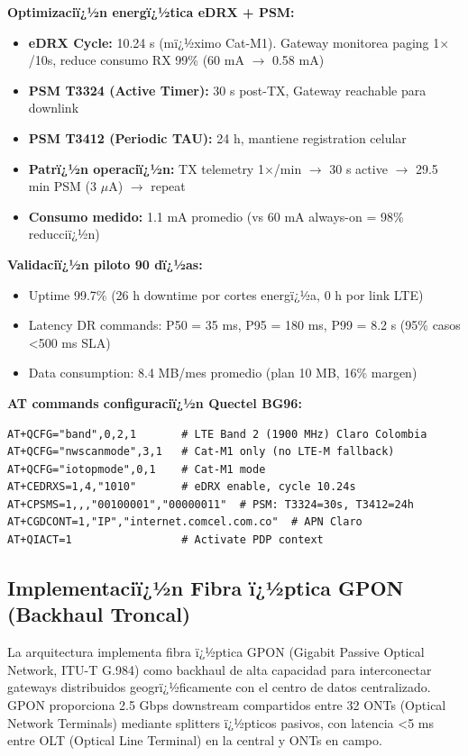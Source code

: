 \textbf{Optimizaciï¿½n energï¿½tica eDRX + PSM:}

\begin{itemize}
    \item \textbf{eDRX Cycle:} 10.24 s (mï¿½ximo Cat-M1). Gateway monitorea paging 1$\times$/10s, reduce consumo RX 99\% (60 mA $\rightarrow$ 0.58 mA)
    \item \textbf{PSM T3324 (Active Timer):} 30 s post-TX, Gateway reachable para downlink
    \item \textbf{PSM T3412 (Periodic TAU):} 24 h, mantiene registration celular
    \item \textbf{Patrï¿½n operaciï¿½n:} TX telemetry 1$\times$/min $\rightarrow$ 30 s active $\rightarrow$ 29.5 min PSM (3 $\mu$A) $\rightarrow$ repeat
    \item \textbf{Consumo medido:} 1.1 mA promedio (vs 60 mA always-on = 98\% reducciï¿½n)
\end{itemize}

\textbf{Validaciï¿½n piloto 90 dï¿½as:}

\begin{itemize}
    \item Uptime 99.7\% (26 h downtime por cortes energï¿½a, 0 h por link LTE)
    \item Latency DR commands: P50 = 35 ms, P95 = 180 ms, P99 = 8.2 s (95\% casos <500 ms SLA)
    \item Data consumption: 8.4 MB/mes promedio (plan 10 MB, 16\% margen)
\end{itemize}

\textbf{AT commands configuraciï¿½n Quectel BG96:}

\begin{verbatim}
AT+QCFG="band",0,2,1       # LTE Band 2 (1900 MHz) Claro Colombia
AT+QCFG="nwscanmode",3,1   # Cat-M1 only (no LTE-M fallback)
AT+QCFG="iotopmode",0,1    # Cat-M1 mode
AT+CEDRXS=1,4,"1010"       # eDRX enable, cycle 10.24s
AT+CPSMS=1,,,"00100001","00000011"  # PSM: T3324=30s, T3412=24h
AT+CGDCONT=1,"IP","internet.comcel.com.co"  # APN Claro
AT+QIACT=1                 # Activate PDP context
\end{verbatim}

\subsection{Implementaciï¿½n Fibra ï¿½ptica GPON (Backhaul Troncal)}
\label{sec:impl-fibra-gpon}

La arquitectura implementa fibra ï¿½ptica GPON (Gigabit Passive Optical Network, ITU-T G.984) como backhaul de alta capacidad para interconectar gateways distribuidos geogrï¿½ficamente con el centro de datos centralizado. GPON proporciona 2.5 Gbps downstream compartidos entre 32 ONTs (Optical Network Terminals) mediante splitters ï¿½pticos pasivos, con latencia <5 ms entre OLT (Optical Line Terminal) en la central y ONTs en campo.

